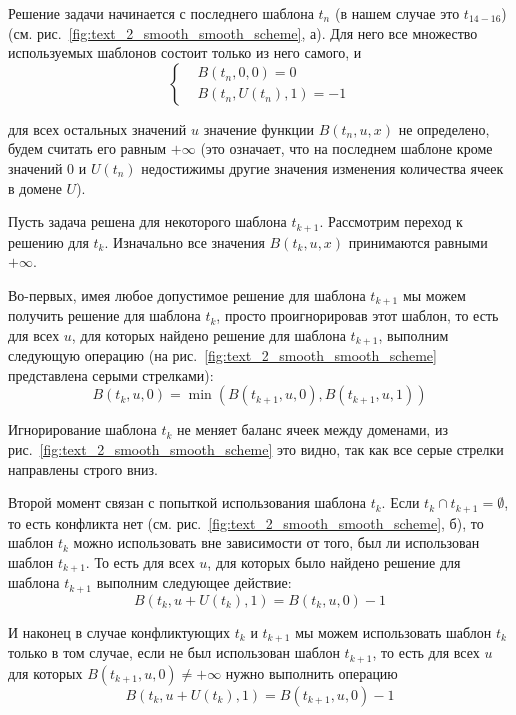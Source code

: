 Решение задачи начинается с последнего шаблона $t_n$ (в нашем случае это $t_{14-16}$) (см. рис.~\ref{fig:text_2_smooth_smooth_scheme}, а).
Для него все множество используемых шаблонов состоит только из него самого, и
\begin{equation}
	\left\{
		\begin{aligned}
			& B(t_n, 0, 0) = 0 \\
			& B(t_n, U(t_n), 1) = -1
		\end{aligned}
	\right.
\end{equation}

для всех остальных значений $u$ значение функции $B(t_n, u, x)$ не определено, будем считать его равным $+\infty$ (это означает, что на последнем шаблоне кроме значений $0$ и $U(t_n)$ недостижимы другие значения изменения количества ячеек в домене $U$).

Пусть задача решена для некоторого шаблона $t_{k + 1}$.
Рассмотрим переход к решению для $t_k$.
Изначально все значения $B(t_k, u, x)$ принимаются равными $+\infty$.

Во-первых, имея любое допустимое решение для шаблона $t_{k + 1}$ мы можем получить решение для шаблона $t_k$, просто проигнорировав этот шаблон, то есть для всех $u$, для которых найдено решение для шаблона $t_{k + 1}$, выполним следующую операцию (на рис.~\ref{fig:text_2_smooth_smooth_scheme} представлена серыми стрелками):
\begin{equation}
	B(t_k, u, 0) = \min \left( B(t_{k + 1}, u, 0), B(t_{k + 1}, u, 1) \right)
\end{equation}

Игнорирование шаблона $t_k$ не меняет баланс ячеек между доменами, из рис.~\ref{fig:text_2_smooth_smooth_scheme} это видно, так как все серые стрелки направлены строго вниз.

Второй момент связан с попыткой использования шаблона $t_k$.
Если $t_k \cap t_{k + 1} = \emptyset$, то есть конфликта нет (см. рис.~\ref{fig:text_2_smooth_smooth_scheme}, б), то шаблон $t_k$ можно использовать вне зависимости от того, был ли использован шаблон $t_{k + 1}$.
То есть для всех $u$, для которых было найдено решение для шаблона $t_{k + 1}$ выполним следующее действие:
\begin{equation}
	B(t_k, u + U(t_k), 1) = B(t_k, u, 0) - 1
\end{equation}

И наконец в случае конфликтующих $t_k$ и $t_{k + 1}$ мы можем использовать шаблон $t_k$ только в том случае, если не был использован шаблон $t_{k + 1}$, то есть для всех $u$ для которых $B(t_{k + 1}, u, 0) \ne +\infty$ нужно выполнить операцию
\begin{equation}
	B(t_k, u + U(t_k), 1) = B(t_{k + 1}, u, 0) - 1
\end{equation}

